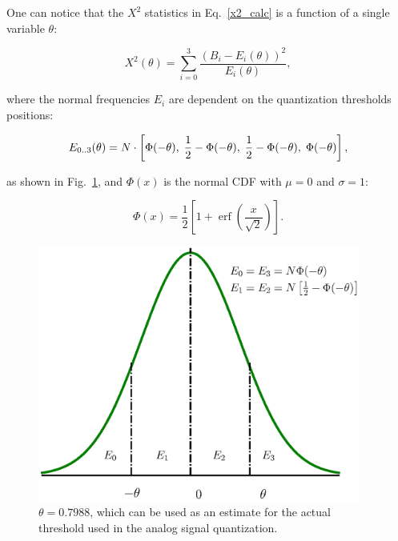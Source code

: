 \documentclass[letterpaper,twoside,12pt]{article}
\newcommand{\twodots}{\mathinner {\ldotp \ldotp}}
\DeclareMathOperator\erf{erf}
\begin{document}
One can notice that the $X^2$ statistics in Eq.~\eqref{x2_calc} is a function of a single variable $\theta$: 

\begin{equation}
  \label{x2_func_of_theta}
  X^2(\theta) = \sum_{i=0}^3 \frac{(B_i - E_i(\theta))^2}{E_i(\theta)},
\end{equation}

where the normal frequencies $E_i$ are dependent on the quantization thresholds positions:

\begin{equation*}
  \label{norm_freq}
  E_{0\twodots3}(\theta) = N \cdot \left[\Phi(-\theta), \; \frac{1}{2}-\Phi(-\theta), \; 
                             \frac{1}{2}-\Phi(-\theta), \; \Phi(-\theta) \right],
\end{equation*}

as shown in Fig.~\ref{npdf_areas}, and $\Phi(x)$ is the normal CDF with $\mu=0$ and $\sigma=1$:

\begin{equation}
  \label{ncdf}
  \Phi(x) = \frac{1}{2} \left[1 + \erf \left( \frac{x}{\sqrt{2}} \right) \right].
\end{equation}


\begin{figure}[ht!]
  \begin{center}
  \includegraphics[width=25pc]{fig_npdf_areas.eps}
  \caption{\small  $\theta = 0.7988$, which can be used as an estimate for the actual threshold used in the analog signal quantization.}
  \label{npdf_areas}
  \end{center}
\end{figure}
\end{document}
